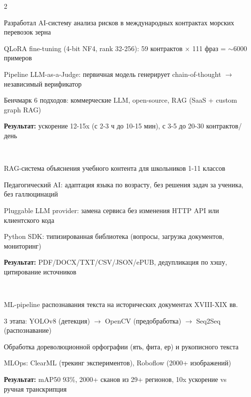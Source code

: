 \documentclass[]{deedy-resume-reversed}
\begin{document}
\begin{paracol}{2}
\\
\begin{tightemize}
\item Разработал AI-систему анализа рисков в международных контрактах морских перевозок зерна
\item QLoRA fine-tuning (4-bit NF4, rank 32-256): 59 контрактов $\times$ 111 фраз = $\sim$6000 примеров
\item Pipeline LLM-as-a-Judge: первичная модель генерирует chain-of-thought $\rightarrow$ независимый верификатор
\item Бенчмарк 6 подходов: коммерческие LLM, open-source, RAG (SaaS + custom graph RAG)
\item \textbf{Результат:} ускорение 12-15x (с 2-3 ч до 10-15 мин), с 3-5 до 20-30 контрактов/день
\end{tightemize}
\sectionsep

\\
\begin{tightemize}
\item RAG-система объяснения учебного контента для школьников 1-11 классов
\item Педагогический AI: адаптация языка по возрасту, без решения задач за ученика, без галлюцинаций
\item Pluggable LLM provider: замена сервиса без изменения HTTP API или клиентского кода
\item Python SDK: типизированная библиотека (вопросы, загрузка документов, мониторинг)
\item \textbf{Результат:} PDF/DOCX/TXT/CSV/JSON/ePUB, дедупликация по хэшу, цитирование источников
\end{tightemize}
\sectionsep

\\
\begin{tightemize}
\item ML-pipeline распознавания текста на исторических документах XVIII-XIX вв.
\item 3 этапа: YOLOv8 (детекция) $\rightarrow$ OpenCV (предобработка) $\rightarrow$ Seq2Seq (распознавание)
\item Обработка дореволюционной орфографии (ять, фита, ер) и рукописного текста
\item MLOps: ClearML (трекинг экспериментов), Roboflow (2000+ изображений)
\item \textbf{Результат:} mAP50 93\%, 2000+ сканов из 29+ регионов, 10x ускорение vs ручная транскрипция
\end{tightemize}
\sectionsep


\end{paracol}
\end{document}
